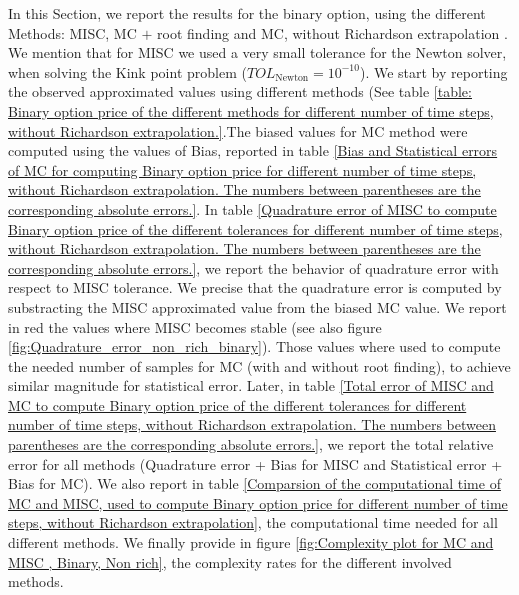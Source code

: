 \documentclass[11pt]{article}
\begin{document}
In this Section, we report the results for the binary option, using the different Methods: MISC, MC $+$ root finding  and MC, without Richardson extrapolation . We mention that for MISC we used a very small tolerance for the Newton solver, when solving the Kink point problem ($TOL_{\text{Newton}}=10^{-10}$). We start by reporting the observed approximated values using different methods (See table \ref{table: Binary option price of the different methods for different number of time steps, without Richardson extrapolation.}.The biased values for MC method were computed using the values of Bias, reported in table \ref{Bias and Statistical errors of MC  for computing Binary option price  for different number of time steps, without Richardson extrapolation. The numbers between parentheses are the corresponding absolute errors.}. In table \ref{Quadrature error of MISC to compute Binary option price of the different tolerances for different number of time steps, without Richardson extrapolation. The numbers between parentheses are the corresponding absolute errors.}, we report the behavior of quadrature error with respect to MISC tolerance. We precise that the quadrature error is computed by substracting the MISC approximated value from the biased MC value. We report in red the values where MISC becomes stable (see also figure \ref{fig:Quadrature_error_non_rich_binary}). Those values where used to compute the needed number of samples for MC (with and without root finding), to achieve similar magnitude  for statistical error. Later, in table \ref{Total error of MISC and MC to compute Binary option price of the different tolerances for different number of time steps, without Richardson extrapolation. The numbers between parentheses are the corresponding absolute errors.}, we report the total relative error for all methods (Quadrature error + Bias for MISC and Statistical error + Bias for MC). We also report in table \ref{Comparsion of the computational time of  MC and MISC, used to compute Binary option price  for different number of time steps, without Richardson extrapolation}, the computational time needed for all different methods.  We finally provide in figure \ref{fig:Complexity plot for MC and MISC , Binary, Non rich}, the complexity rates for the different involved methods.
\end{document}
